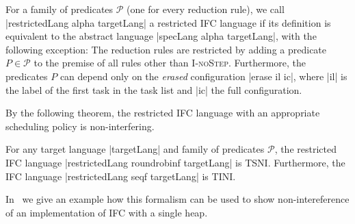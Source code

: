 



\begin{definition}
  \label{def:restricted}
  For a family of predicates $\mathcal P$ (one for every reduction
  rule), we call
  |restrictedLang alpha targetLang| a restricted IFC language
  if its definition is equivalent to the abstract language
  |specLang alpha targetLang|, with the following exception:
  The reduction rules are restricted
  by adding a predicate $P \in \mathcal P$ to the premise of
  all rules other than \textsc{I-noStep}.  Furthermore, the predicates $P$
  can depend only on the \textit{erased} configuration
  |erase il ic|, where |il| is the label of the first task
  in the task list and |ic| the full configuration.
\end{definition}

By the following theorem, the restricted IFC language with an
appropriate scheduling policy is non-interfering.

\begin{theorem}
  \label{thm:restricted}
  For any target language |targetLang| and family of predicates
  $\mathcal{P}$, the restricted IFC language |restrictedLang roundrobinf targetLang|
  is TSNI.  Furthermore, the IFC language
  |restrictedLang seqf targetLang| is TINI.
\end{theorem}

In~ we give an example how this formalism can be used
to show non-intereference of an implementation of IFC with a single heap.
